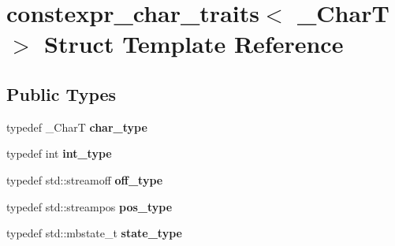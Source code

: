 \hypertarget{structconstexpr__char__traits}{}\section{constexpr\+\_\+char\+\_\+traits$<$ \+\_\+\+CharT $>$ Struct Template Reference}
\label{structconstexpr__char__traits}
\subsection*{Public Types}
\begin{DoxyCompactItemize}
\item 
\mbox{\label{structconstexpr__char__traits_a4e5a86c26a834e7723ebee3afe45a6c9}} 
typedef \+\_\+\+CharT {\bfseries char\+\_\+type}
\item 
\mbox{\label{structconstexpr__char__traits_aaaf0caa6446ad5af9b64eff747073765}} 
typedef int {\bfseries int\+\_\+type}
\item 
\mbox{\label{structconstexpr__char__traits_af8daf14d04d8c2ee2efcafeae2930270}} 
typedef std\+::streamoff {\bfseries off\+\_\+type}
\item 
\mbox{\label{structconstexpr__char__traits_a0bd5595709e3547790326f43aad6cf50}} 
typedef std\+::streampos {\bfseries pos\+\_\+type}
\item 
\mbox{\label{structconstexpr__char__traits_a7ed19b8e8d6a7fce4030c23369648e32}} 
typedef std\+::mbstate\+\_\+t {\bfseries state\+\_\+type}
\end{DoxyCompactItemize}
